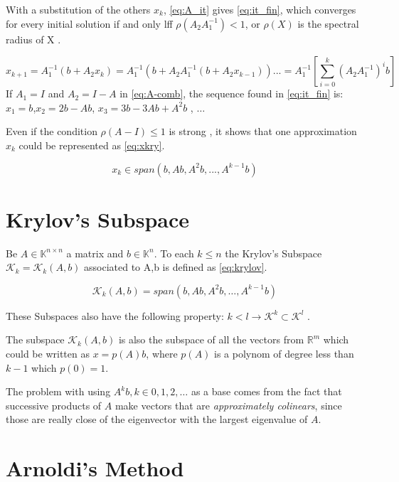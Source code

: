     With a substitution of the others $x_{k}$, \ref{eq:A_it} gives \ref{eq:it_fin}, which converges for every initial solution if and only lff $\rho(A_{2}A_{1}^{-1}) < 1$, or $\rho(X)$ is the spectral radius of X \cite{bonnet}.

    \begin{equation}\label{eq:it_fin}
        x_{k+1} = A_{1}^{-1}(b + A_{2}x_{k}) = A_{1}^{-1}(b + A_{2}A_{1}^{-1}(b + A_{2}x_{k-1}))... = A_{1}^{-1} \left[ \sum_{i=0}^{k} (A_{2}A_{1}^{-1})^{i}b\right]
    \end{equation}
    If $A_{1} = I$ and $A_{2} = I - A$ in \ref{eq:A-comb}, the sequence found in \ref{eq:it_fin} is: $x_{1} = b$,$x_{2} = 2b- Ab$, $x_{3} = 3b-3Ab+A^{2}b$ , $\dots$

    Even if the condition $\rho(A-I) \leq 1$ is strong \cite{bonnet}, it shows that one approximation $x_{k}$ could be represented as \ref{eq:xkry}.
    
    \begin{equation}\label{eq:xkry}
        x_{k} \in span(b,Ab,A^{2}b,...,A^{k-1}b)
    \end{equation}

    \section{Krylov's Subspace}
    Be $A \in \mathbb{K}^{n \times n}$ a matrix and $b\in \mathbb{K}^{n}$. To each $k\leq n$ the Krylov's Subspace $\mathcal{K}_{k}=\mathcal{K}_{k}(A,b)$ associated to A,b is defined as \ref{eq:krylov}.

    \begin{equation}\label{eq:krylov}
        \mathcal{K}_{k}(A,b) = span(b,Ab,A^{2}b,\dots , A^{k-1}b)
    \end{equation}

    These Subspaces also have the following property: $k<l \to \mathcal{K}^{k} \subset \mathcal{K}^{l}$ \cite{bonnet}.

    The subspace $\mathcal{K}_{k}(A,b)$ is also the subspace of all the vectors from $\mathbb{R}^{m}$ which could be written as $x=p(A)b$, where $p(A)$ is a polynom of degree less than $k-1$ which $p(0)=1$.

    The problem with using ${A^{k}b}, k \in {0,1,2,\dots}$ as a base comes from the fact that successive products of $A$ make vectors that are \textit{approximately colinears}, since those are really close of the eigenvector with the largest eigenvalue of $A$.

    \section{Arnoldi's Method}
    
